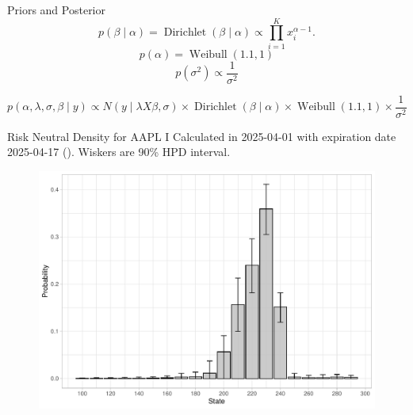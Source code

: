 \documentclass[10pt,aspectratio=43]{beamer}
\begin{document}
\begin{frame}{Priors and Posterior}
     \[p(\beta\mid \alpha)=\operatorname{Dirichlet}(\beta\mid \alpha)\propto \prod_{i=1}^{K}x_{i}^{\alpha-1}.\]
    \[p(\alpha)=\operatorname{Weibull}(1.1,1)\]
    \[p(\sigma^2)\propto \frac{1}{\sigma^2}\]

    \[p(\alpha,\lambda,\sigma,\beta\mid y)\propto N(y\mid \lambda X\beta,\sigma)\times\operatorname{Dirichlet}(\beta\mid \alpha)\times \operatorname{Weibull}(1.1,1)\times \frac{1}{\sigma^2}\]

\end{frame}





\begin{frame}{Risk Neutral Density for AAPL I}
    Calculated in 2025-04-01 with expiration date 2025-04-17 (). Wiskers are 90\% HPD interval.
     \begin{figure}\centering
        \begin{minipage}{0.75\linewidth}
        \includegraphics[width=\linewidth]{betas_01_1.pdf}
     \end{minipage}
    \end{figure}
\end{frame}
\end{document}
